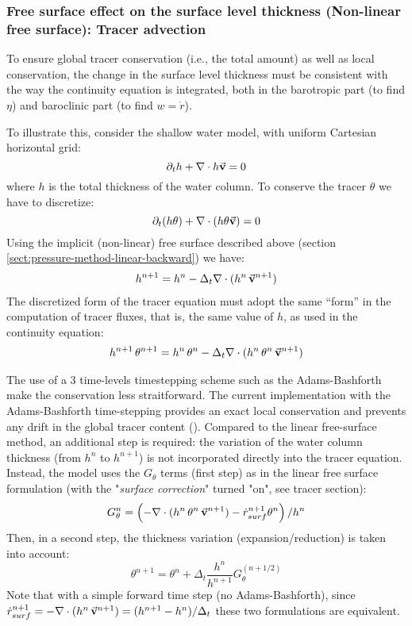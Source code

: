 \subsubsection{Free surface effect on the surface level thickness
(Non-linear free surface): Tracer advection}
\label{sect:freesurf-tracer-advection}

To ensure global tracer conservation (i.e., the total amount) as well
as local conservation, the change in the surface level thickness must
be consistent with the way the continuity equation is integrated, both
in the barotropic part (to find $\eta$) and baroclinic part (to find
$w = \dot{r}$).

To illustrate this, consider the shallow water model, with uniform
Cartesian horizontal grid:
$$
\partial_t h + \nabla \cdot h \vec{\bf v} = 0
$$
where $h$ is the total thickness of the water column.
To conserve the tracer $\theta$ we have to discretize:
$$
\partial_t (h \theta) + \nabla \cdot ( h \theta \vec{\bf v})= 0
$$
Using the implicit (non-linear) free surface described above (section
\ref{sect:pressure-method-linear-backward}) we have:
\begin{eqnarray*}
h^{n+1} = h^{n} - \Delta_t \nabla \cdot (h^n \, \vec{\bf v}^{n+1} ) \\
\end{eqnarray*}
The discretized form of the tracer equation must adopt the same
``form'' in the computation of tracer fluxes, that is, the same value
of $h$, as used in the continuity equation:
\begin{eqnarray*}
h^{n+1} \, \theta^{n+1} = h^n \, \theta^n 
        - \Delta_t \nabla \cdot (h^n \, \theta^n \, \vec{\bf v}^{n+1})
\end{eqnarray*}

The use of a 3 time-levels timestepping scheme such as the Adams-Bashforth
make the conservation less straitforward.
The current implementation with the Adams-Bashforth time-stepping
provides an exact local conservation and prevents any drift in
the global tracer content (\cite{campin:02}).
Compared to the linear free-surface method, an additional step is required:
the variation of the water column thickness (from $h^n$ to $h^{n+1}$) is
not incorporated directly into the tracer equation.  Instead, the
model uses the $G_\theta$ terms (first step) as in the linear free
surface formulation (with the "{\it surface correction}" turned "on",
see tracer section):
$$
G_\theta^n = \left(- \nabla \cdot (h^n \, \theta^n \, \vec{\bf v}^{n+1}) 
         - \dot{r}_{surf}^{n+1} \theta^n \right) / h^n
$$
Then, in a second step, the thickness variation (expansion/reduction)
is taken into account:
$$
\theta^{n+1} = \theta^n + \Delta_t \frac{h^n}{h^{n+1}} G_\theta^{(n+1/2)} 
$$
Note that with a simple forward time step (no Adams-Bashforth), 
since
$
\dot{r}_{surf}^{n+1} 
= - \nabla \cdot (h^n \, \vec{\bf v}^{n+1} ) = (h^{n+1} - h^{n})
/ \Delta_t
$
these two formulations are equivalent. 

